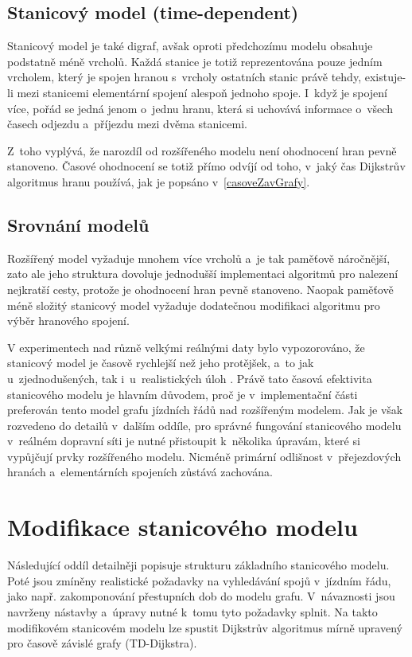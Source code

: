 \subsection{Stanicový model (time-dependent)}
Stanicový model je také digraf, avšak oproti předchozímu modelu obsahuje podstatně méně vrcholů. Každá stanice je totiž reprezentována pouze jedním vrcholem, který je spojen hranou s~vrcholy ostatních stanic právě tehdy, existuje-li mezi stanicemi elementární spojení alespoň jednoho spoje. I~když je spojení více, pořád se jedná jenom o~jednu hranu, která si uchovává informace o~všech časech odjezdu a~příjezdu mezi dvěma stanicemi. 

Z~toho vyplývá, že narozdíl od rozšířeného modelu není ohodnocení hran pevně stanoveno. Časové ohodnocení se totiž přímo odvíjí od toho, v~jaký čas Dijkstrův algoritmus hranu používá, jak je popsáno v~\autoref{casoveZavGrafy}. 

\renewcommand{\subsectionautorefname}{pododdíl}

\subsection{Srovnání modelů}
Rozšířený model vyžaduje mnohem více vrcholů a~je tak paměťově náročnější, zato ale jeho struktura dovoluje jednodušší implementaci algoritmů pro nalezení nejkratší cesty, protože je ohodnocení hran pevně stanoveno. Naopak paměťově méně složitý stanicový model vyžaduje dodatečnou modifikaci algoritmu pro výběr hranového spojení. 

V experimentech nad různě velkými reálnými daty bylo vypozorováno, že stanicový model je časově rychlejší než jeho protějšek, a~to jak u~zjednodušených, tak i~u~realistických úloh \cite{pyrga2008efficient}. Právě tato časová efektivita stanicového modelu je hlavním důvodem, proč je v~implementační části preferován tento model grafu jízdních řádů nad rozšířeným modelem. Jak je však rozvedeno do detailů v~dalším oddíle, pro správné fungování stanicového modelu v~reálném dopravní síti je nutné přistoupit k~několika úpravám, které si vypůjčují prvky rozšířeného modelu. Nicméně primární odlišnost v~přejezdových hranách a~elementárních spojeních zůstává zachována.

\section{Modifikace stanicového modelu}
Následující oddíl detailněji popisuje strukturu základního stanicového modelu. Poté jsou zmíněny realistické požadavky na vyhledávání spojů v~jízdním řádu, jako např. zakomponování přestupních dob do modelu grafu. V~návaznosti jsou navrženy nástavby a~úpravy nutné k~tomu tyto požadavky splnit. Na takto modifikovém stanicovém modelu lze spustit Dijkstrův algoritmus mírně upravený pro časově závislé grafy (TD-Dijkstra).


